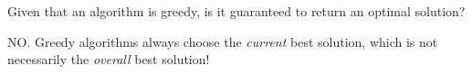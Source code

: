 Given that an algorithm is greedy, is it guaranteed to return an optimal solution?

\begin{answer}
NO.  Greedy algorithms always choose the \textit{current} best solution, which is not necessarily the \textit{overall} best solution!
\end{answer}